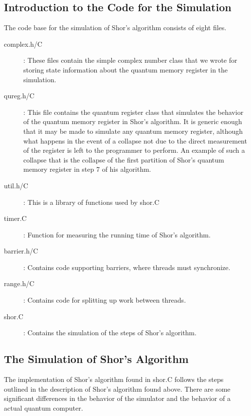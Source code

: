 \documentclass[]{article}
\begin{document}
\subsection{Introduction to the Code for the Simulation}

The code base for the simulation of Shor's algorithm consists of eight
files.

\begin{description}

\item[complex.h/C]: These files contain the simple complex number
  class that we wrote for storing state information about the quantum
  memory register in the simulation.

\item[qureg.h/C]: This file contains the quantum register class that
  simulates the behavior of the quantum memory register in Shor's
  algorithm.  It is generic enough that it may be made to simulate any
  quantum memory register, although what happens in the event of a
  collapse not due to the direct measurement of the register is left
  to the programmer to perform.  An example of such a collapse that is
  the collapse of the first partition of Shor's quantum memory
  register in step 7 of his algorithm.

\item[util.h/C]: This is a library of functions used by shor.C

\item[timer.C]: Function for measuring the running time of Shor's
  algorithm.

\item[barrier.h/C]: Contains code supporting barriers, where threads
  must synchronize.

\item[range.h/C]: Contains code for splitting up work between threads.

\item[shor.C]: Contains the simulation of the steps of Shor's algorithm.

\end{description}

\subsection{The Simulation of Shor's Algorithm}

The implementation of Shor's algorithm found in shor.C follows the
steps outlined in the description of Shor's algorithm found above.
There are some significant differences in the behavior of the
simulator and the behavior of a actual quantum computer.
\end{document}

